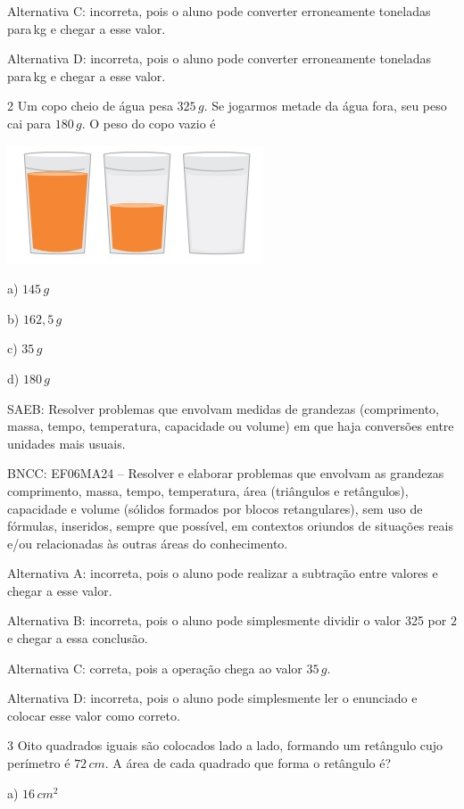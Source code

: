 Alternativa C: incorreta, pois o aluno pode converter erroneamente
toneladas para\,kg e chegar a esse valor.

Alternativa D: incorreta, pois o aluno pode converter erroneamente
toneladas para\,kg e chegar a esse valor.

\num{2}  Um copo cheio de água pesa $325\,g$. Se jogarmos metade da água fora, seu
peso cai para $180\,g$. O peso do copo vazio é

\includegraphics[width=2.98958in,height=1.38542in]{./imgSAEB_6_MAT/media/image100.png}

a) $145\,g$

b) $162,5\,g$

c) $35\,g$

d) $180\,g$

SAEB: Resolver problemas que envolvam medidas de grandezas (comprimento,
massa, tempo, temperatura, capacidade ou volume) em que haja conversões
entre unidades mais usuais.

BNCC: EF06MA24 -- Resolver e elaborar problemas que envolvam as
grandezas comprimento, massa, tempo, temperatura, área (triângulos e
retângulos), capacidade e volume (sólidos formados por blocos
retangulares), sem uso de fórmulas, inseridos, sempre que possível, em
contextos oriundos de situações reais e/ou relacionadas às outras áreas
do conhecimento.

Alternativa A: incorreta, pois o aluno pode realizar a subtração entre
valores e chegar a esse valor.

Alternativa B: incorreta, pois o aluno pode simplesmente dividir o valor
325 por $2$ e chegar a essa conclusão.

Alternativa C: correta, pois a operação chega ao valor $35\,g$.

Alternativa D: incorreta, pois o aluno pode simplesmente ler o enunciado
e colocar esse valor como correto.

\num{3}  Oito quadrados iguais são colocados lado a lado, formando um
retângulo cujo perímetro é $72\,cm$. A área de cada quadrado que forma o
retângulo é?

a) $16\,cm^2$

